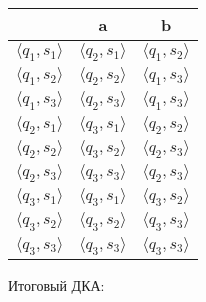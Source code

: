 \documentclass[a4paper,12pt]{article}
\begin{document}
\begin{center}
\begin{tabular}{ |c|c|c| } 
\hline
  & a & b \\ [0.5ex] 
 \hline
 $\langle q_1 , s_1 \rangle$ & $\langle q_2 , s_1 \rangle$ & $\langle q_1 , s_2 \rangle$ \\ 
 $\langle q_1 , s_2 \rangle $ & $\langle q_2 , s_2 \rangle$ & $\langle q_1 , s_3 \rangle$ \\ 
 $\langle q_1 , s_3 \rangle $ & $\langle q_2 , s_3 \rangle$ & $\langle q_1 , s_3 \rangle$ \\ 
 $\langle q_2 , s_1 \rangle $ & $\langle q_3 , s_1 \rangle$ & $\langle q_2 , s_2 \rangle$ \\ 
 $\langle q_2 , s_2 \rangle $ & $\langle q_3 , s_2 \rangle$ & $\langle q_2 , s_3 \rangle$ \\
 $\langle q_2 , s_3 \rangle $ & $\langle q_3 , s_3 \rangle$ & $\langle q_2 , s_3 \rangle$ \\
 $\langle q_3 , s_1 \rangle $ & $\langle q_3 , s_1 \rangle$ & $\langle q_3 , s_2 \rangle$ \\
 $\langle q_3 , s_2 \rangle $ & $\langle q_3 , s_2 \rangle$ & $\langle q_3 , s_3 \rangle$ \\
 $\langle q_3 , s_3 \rangle $ & $\langle q_3 , s_3 \rangle$ & $\langle q_3 , s_3 \rangle$ \\
 \hline
\end{tabular}
\end{center}
\endgroup
\begingroup
\raggedright 
Итоговый ДКА: \newline
\end{document}
